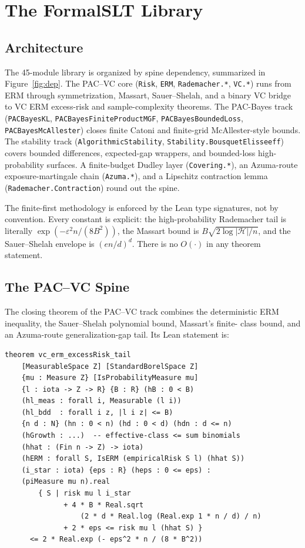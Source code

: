 \documentclass[10pt,twocolumn,letterpaper]{article}
\newcommand{\Hyp}{\mathcal{H}}
\begin{document}
\section{The FormalSLT Library}
\label{sec:library}

\subsection{Architecture}

The 45-module library is organized by spine dependency, summarized in
Figure~\ref{fig:dep}. The PAC--VC core (\texttt{Risk}, \texttt{ERM},
\texttt{Rademacher.*}, \texttt{VC.*}) runs from ERM through symmetrization,
Massart, Sauer--Shelah, and a binary VC bridge to VC ERM excess-risk and
sample-complexity theorems. The PAC-Bayes track
(\texttt{PACBayesKL}, \texttt{PACBayesFiniteProductMGF},
\texttt{PACBayesBoundedLoss}, \texttt{PACBayesMcAllester}) closes finite
Catoni and finite-grid McAllester-style bounds. The stability track
(\texttt{AlgorithmicStability}, \texttt{Stability.BousquetElisseeff}) covers
bounded differences, expected-gap wrappers, and bounded-loss high-probability
surfaces.
A finite-budget Dudley layer (\texttt{Covering.*}), an Azuma-route
exposure-martingale chain (\texttt{Azuma.*}), and a Lipschitz
contraction lemma (\texttt{Rademacher.Contraction}) round out the
spine.

The finite-first methodology is enforced by the Lean type signatures,
not by convention. Every constant is explicit: the high-probability
Rademacher tail is literally $\exp(-\varepsilon^2 n / (8 B^2))$, the
Massart bound is $B\sqrt{2 \log |\Hyp| / n}$, and the Sauer--Shelah
envelope is $(en/d)^d$. There is no $O(\cdot)$ in any theorem
statement.

\subsection{The PAC--VC Spine}

The closing theorem of the PAC--VC track combines the deterministic
ERM inequality, the Sauer--Shelah polynomial bound, Massart's finite-
class bound, and an Azuma-route generalization-gap tail. Its Lean
statement is:

\begin{lstlisting}[caption={VC ERM excess-risk tail
                  (\texttt{FormalSLT/VC/SampleComplexity.lean:334}).},
                  label={lst:vcerm}]
theorem vc_erm_excessRisk_tail
    [MeasurableSpace Z] [StandardBorelSpace Z]
    {mu : Measure Z} [IsProbabilityMeasure mu]
    {l : iota -> Z -> R} {B : R} (hB : 0 < B)
    (hl_meas : forall i, Measurable (l i))
    (hl_bdd  : forall i z, |l i z| <= B)
    {n d : N} (hn : 0 < n) (hd : 0 < d) (hdn : d <= n)
    (hGrowth : ...)  -- effective-class <= sum binomials
    (hhat : (Fin n -> Z) -> iota)
    (hERM : forall S, IsERM (empiricalRisk S l) (hhat S))
    (i_star : iota) {eps : R} (heps : 0 <= eps) :
    (piMeasure mu n).real
        { S | risk mu l i_star
              + 4 * B * Real.sqrt
                  (2 * d * Real.log (Real.exp 1 * n / d) / n)
              + 2 * eps <= risk mu l (hhat S) }
      <= 2 * Real.exp (- eps^2 * n / (8 * B^2))
\end{lstlisting}
\end{document}

